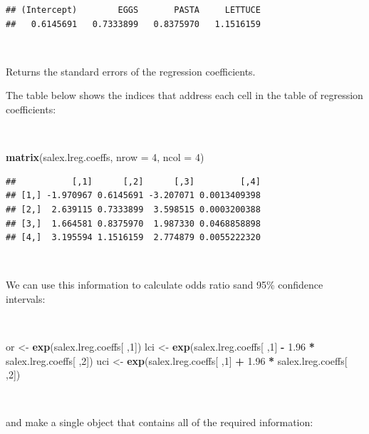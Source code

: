 \documentclass[12pt,a4paper]{book}
\newenvironment{Shaded}{\begin{snugshade}}{\end{snugshade}}
\newcommand{\DataTypeTok}[1]{\textcolor[rgb]{0.13,0.29,0.53}{#1}}
\newcommand{\DecValTok}[1]{\textcolor[rgb]{0.00,0.00,0.81}{#1}}
\newcommand{\FloatTok}[1]{\textcolor[rgb]{0.00,0.00,0.81}{#1}}
\newcommand{\KeywordTok}[1]{\textcolor[rgb]{0.13,0.29,0.53}{\textbf{#1}}}
\newcommand{\NormalTok}[1]{#1}
\newcommand{\OperatorTok}[1]{\textcolor[rgb]{0.81,0.36,0.00}{\textbf{#1}}}
\newcommand{\StringTok}[1]{\textcolor[rgb]{0.31,0.60,0.02}{#1}}
\theoremstyle{definition}
\theoremstyle{definition}
\theoremstyle{definition}
\theoremstyle{remark}
\begin{document}
\begin{verbatim}
## (Intercept)        EGGS       PASTA     LETTUCE 
##   0.6145691   0.7333899   0.8375970   1.1516159
\end{verbatim}

~

Returns the standard errors of the regression coefficients.

The table below shows the indices that address each cell in the table of
regression coefficients:

~

\begin{Shaded}
\begin{Highlighting}[]
\KeywordTok{matrix}\NormalTok{(salex.lreg.coeffs, }\DataTypeTok{nrow =} \DecValTok{4}\NormalTok{, }\DataTypeTok{ncol =} \DecValTok{4}\NormalTok{)}
\end{Highlighting}
\end{Shaded}

\begin{verbatim}
##           [,1]      [,2]      [,3]         [,4]
## [1,] -1.970967 0.6145691 -3.207071 0.0013409398
## [2,]  2.639115 0.7333899  3.598515 0.0003200388
## [3,]  1.664581 0.8375970  1.987330 0.0468858898
## [4,]  3.195594 1.1516159  2.774879 0.0055222320
\end{verbatim}

~

We can use this information to calculate odds ratio sand 95\% confidence
intervals:

~

\begin{Shaded}
\begin{Highlighting}[]
\NormalTok{or <-}\StringTok{ }\KeywordTok{exp}\NormalTok{(salex.lreg.coeffs[ ,}\DecValTok{1}\NormalTok{])}
\NormalTok{lci <-}\StringTok{ }\KeywordTok{exp}\NormalTok{(salex.lreg.coeffs[ ,}\DecValTok{1}\NormalTok{] }\OperatorTok{-}\StringTok{ }\FloatTok{1.96} \OperatorTok{*}\StringTok{ }\NormalTok{salex.lreg.coeffs[ ,}\DecValTok{2}\NormalTok{])}
\NormalTok{uci <-}\StringTok{ }\KeywordTok{exp}\NormalTok{(salex.lreg.coeffs[ ,}\DecValTok{1}\NormalTok{] }\OperatorTok{+}\StringTok{ }\FloatTok{1.96} \OperatorTok{*}\StringTok{ }\NormalTok{salex.lreg.coeffs[ ,}\DecValTok{2}\NormalTok{])}
\end{Highlighting}
\end{Shaded}

~

and make a single object that contains all of the required information:
\end{document}
